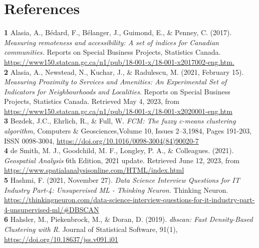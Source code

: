 \documentclass[11pt, a4paper]{article}
\begin{document}
\pagebreak
\section{References}




\noindent\textbf{1} Alasia, A., Bédard, F., Bélanger, J., Guimond, E., \& Penney, C. (2017). \textit{Measuring remoteness and accessibility: A set of indices for Canadian communities.} Reports on Special Business Projects, Statistics Canada. \sloppy\url{https://www150.statcan.gc.ca/n1/pub/18-001-x/18-001-x2017002-eng.htm.} \\

\noindent\textbf{2} Alasia, A., Newstead, N., Kuchar, J., \& Radulescu, M. (2021, February 15). \textit{Measuring Proximity to Services and Amenities: An Experimental Set of Indicators for Neighbourhoods and Localities}. Reports on Special Business Projects, Statistics Canada. Retrieved May 4, 2023, from \sloppy\url{https://www150.statcan.gc.ca/n1/pub/18-001-x/18-001-x2020001-eng.htm}  \\

\noindent\textbf{3} Bezdek, J.C., Ehrlich, R., \& Full, W. \textit{FCM: The fuzzy c-means clustering algorithm}, Computers \& Geosciences,Volume 10, Issues 2–3,1984, Pages 191-203, ISSN 0098-3004, \sloppy\url{https://doi.org/10.1016/0098-3004(84)90020-7} \\ %

\noindent\textbf{4} de Smith, M. J., Goodchild, M. F., Longley, P. A., \& Colleagues. (2021). \textit{Geospatial Analysis} 6th Edition, 2021 update. Retrieved June 12, 2023, from \sloppy\url{https://www.spatialanalysisonline.com/HTML/index.html
} \\

\noindent\textbf{5} Hashmi, F. (2021, November 27). \textit{Data Science Interview Questions for IT Industry Part-4: Unsupervised ML - Thinking 	Neuron}. Thinking Neuron. \sloppy\url{https://thinkingneuron.com/data-science-interview-questions-for-it-industry-part-4-unsupervised-ml/\#DBSCAN} \\

\noindent\textbf{6} Hahsler, M., Piekenbrock, M., \& Doran, D. (2019). \textit{dbscan: Fast Density-Based Clustering with R}. Journal of Statistical Software, 91(1), \sloppy\url{https://doi.org/10.18637/jss.v091.i01} \\
\end{document}
